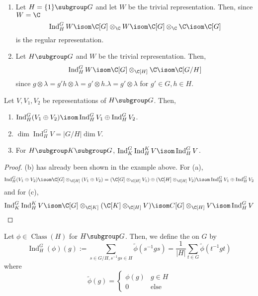 \documentclass[11pt,leqno,oneside]{amsbook}
\newcommand{\Class}{\operatorname{Class}}
\newcommand{\Ind}{\operatorname{Ind}}
\numberwithin{thm}{section}
\begin{document}
\begin{example}
  \begin{enumerate}
  \item Let \(H = \{1\} \subgroup G\) and let \(W\) be the trivial
    representation. Then, since \(W = \C\) \[
      \Ind_H^G W \isom \C[G] \otimes_{\C} W \isom \C[G] \otimes_{\C}
      \C \isom \C[G]
    \]
    is the regular representation.
  \item Let \(H \subgroup G\) and \(W\) be the trivial
    representation. Then, \[
      \Ind_H^G W \isom \C[G] \otimes_{\C[H]} \C \isom \C[G/H]
    \]
    since \(g \otimes \lambda = g'h \otimes \lambda = g' \otimes
    h.\lambda = g' \otimes \lambda\) for \(g' \in G, h \in H\).
  \end{enumerate}
\end{example}
\begin{prop}
  Let \(V, V_1, V_2\) be representations of \(H \subgroup G\). Then, 
  \begin{enumerate}
  \item \(\Ind_H^G(V_1 \oplus V_2) \isom \Ind_H^G V_1 \oplus \Ind_H^G
    V_2\).
  \item \(\dim \Ind_H^G V = |G/H| \dim V\).
  \item For \(H \subgroup K \subgroup G\), \(\Ind_K^G \Ind_H^K V \isom
    \Ind_H^G V\).
  \end{enumerate}
\end{prop}
\begin{proof}
  (b) has already been shown in the example above. For (a), \[
    \Ind_H^G(V_1 \oplus V_2) \isom \C[G] \otimes_{\C[H]}(V_1 \oplus
    V_2)  = (\C[G] \otimes_{\C[H]} V_1) \oplus (\C[H] \otimes_{\C[H]}
    V_2) \isom \Ind_H^G V_1 \oplus \Ind_H^G V_2
  \]
  and for (c), \[
    \Ind_K^G \Ind_H^K V \isom \C[G] \otimes_{\C[K]} (\C[K] \otimes_{\C[H]} V) \isom C[G]
    \otimes_{\C[H]} V \isom \Ind_H^G V
  \]
\end{proof}
\begin{defn}
  Let \(\phi \in \Class(H)\) for \(H \subgroup G\). Then, we define
  the  on \(G\) by \[
    \Ind_H^G(\phi)(g) := \sum_{s \in G/H, s^{-1}gs \in H} \tilde{\phi}(s^{-1}gs) = \frac{1}{|H|}\sum_{t \in
    G} \tilde{\phi}(t^{-1}gt)
  \]
  where \[
    \tilde{\phi}(g) =
    \begin{cases}
      \phi(g) & g \in H \\
      0 & \text{else}
    \end{cases}
  \]
\end{defn}
\end{document}
